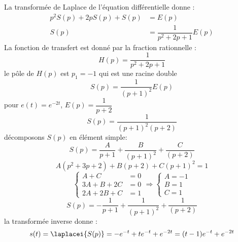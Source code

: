 La transformée de Laplace de l'équation différentielle donne :
\begin{align*}
    p^2S(p)+2pS(p)+S(p)&=E(p) \\
    S(p)&=\dfrac{1}{p^2+2p+1}E(p)
\end{align*}
La fonction de transfert est donné par la fraction rationnelle :
\[
H(p)=\dfrac{1}{p^2+2p+1}
\]
le pôle de $H(p)$ est $p_1=-1$ qui est une racine double
\[
S(p) = \dfrac{1}{(p+1)^2}E(p)
\]
pour $e(t)=e^{-2t}$, $E(p)=\dfrac{1}{p+2}$
\[
S(p)=\dfrac{1}{(p+1)^2(p+2)}
\]
décomposons $S(p)$ en élément simple:
\[
S(p)=\dfrac{A}{p+1}+\dfrac{B}{(p+1)^2}+\dfrac{C}{(p+2)}
\]
\[
A(p^2+3p+2)+B(p+2)+C(p+1)^2=1
\]
\[
\begin{cases}
     A+C&=0 \\
    3A+B+2C&=0 \\
    2A+2B+C&=1
\end{cases}\Longrightarrow
\begin{cases}
    A=-1\\
    B=1\\
    C=1
\end{cases}
\]
\[
S(p)=-\dfrac{1}{p+1}+\dfrac{1}{(p+1)^2}+\dfrac{1}{(p+2)}
\]
la transformée inverse donne :
\[
s(t) = \laplacei{S(p)}= -e^{-t}+te^{-t}+e^{-2t} = (t-1)e^{-t}+e^{-2t}
\]
\begin{center}
\end{center}
